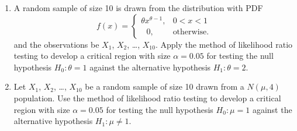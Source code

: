 \documentclass[11pt, a4paper]{article}
\begin{document}
\begin{enumerate}
	
	
	
	
	
	
	
	
	
	
	
	
	\item A random sample of size 10 is drawn from the distribution with PDF 
	\begin{equation*}
	f(x) = 
		\begin{cases}
		\theta x^{\theta - 1}, & 0 < x < 1 \\
		\hspace{8pt} 0, & \text{otherwise.}
		\end{cases}	
	\end{equation*}
	and the observations be $X_1$, $X_2$, \ldots, $X_{10}$. Apply the method of likelihood ratio testing to develop a critical region with size $\alpha = 0.05$ for testing the null hypothesis $H_0 : \theta = 1$ against the alternative hypothesis $H_1 : \theta = 2$.
	
	
	
	
	
	
	
	
	
	
	
	
	
	\item Let $X_1$, $X_2$, \ldots, $X_{10}$ be a random sample of size 10 drawn from a $N(\mu, 4)$ population. Use the method of likelihood ratio testing to develop a critical region with size $\alpha = 0.05$ for testing the null hypothesis $H_0 : \mu = 1$ against the alternative hypothesis $H_1 : \mu \neq 1$.
\end{enumerate}
\end{document}
